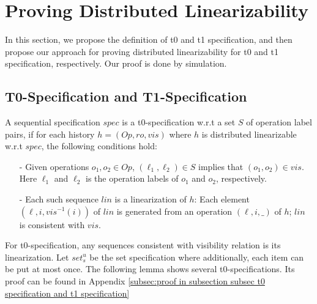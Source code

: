 
\section{Proving Distributed Linearizability}
\label{sec:proving distributed linearizability}

In this section, we propose the definition of t0 and t1 specification, and then propose our approach for proving distributed linearizability for t0 and t1 specification, respectively. Our proof is done by simulation. 



\subsection{T0-Specification and T1-Specification}
\label{subsec:t0 specification and t1 specification} 



\begin{definition}[t0-specification]
\label{definition:t0-specification}
A sequential specification $\mathit{spec}$ is a t0-specification w.r.t a set $S$ of operation label pairs, if for each history $h=(\mathit{Op},\mathit{ro},\mathit{vis})$ where $h$ is distributed linearizable w.r.t $\mathit{spec}$, the following conditions hold:

\begin{itemize}
\setlength{\itemsep}{0.5pt}
\item[-] Given operations $o_1,o_2 \in \mathit{Op}$, $(\ell_1,\ell_2) \in S$ implies that $(o_1,o_2) \in \mathit{vis}$. Here $\ell_1$ and $\ell_2$ is the operation labels of $o_1$ and $o_2$, respectively.

\item[-] Each such sequence $\mathit{lin}$ is a linearization of $h$: Each element $(\ell,i,\mathit{vis}^{-1}(i))$ of $\mathit{lin}$ is generated from an operation $(\ell,i,\_)$ of $h$; $\mathit{lin}$ is consistent with $\mathit{vis}$. 
\end{itemize}
\end{definition}

For t0-specification, any sequences consistent with visibility relation is its linearization. Let $\mathit{set}_s^u$ be the set specification where additionally, each item can be put at most once. The following lemma shows several t0-specifications. Its proof can be found in Appendix \ref{subsec:proof in subsection subsec t0 specification and t1 specification}

